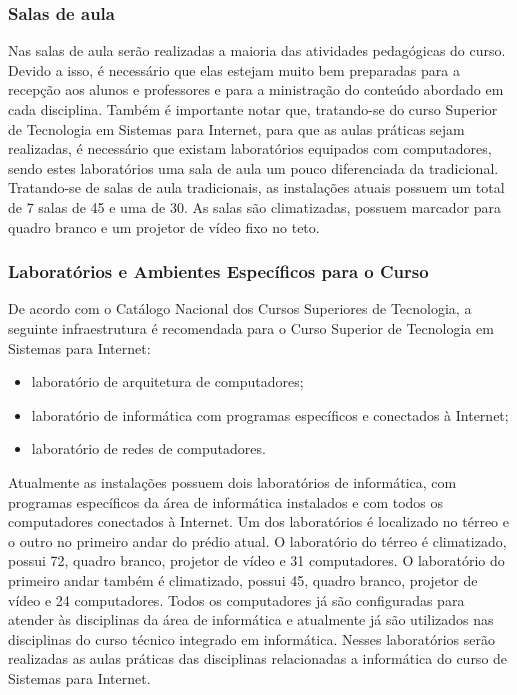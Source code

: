 \subsubsection{Salas de aula}

Nas salas de aula serão realizadas a maioria das atividades pedagógicas do curso. Devido a isso, é necessário que elas estejam muito bem preparadas para a recepção aos alunos e professores e para a ministração do conteúdo abordado em cada disciplina. Também é importante notar que, tratando-se do curso Superior de Tecnologia em Sistemas para Internet, para que as aulas práticas sejam realizadas, é necessário que existam laboratórios equipados com computadores,  sendo estes laboratórios uma sala de aula um pouco diferenciada da tradicional. Tratando-se de salas de aula tradicionais, as instalações atuais possuem um total de 7 salas de \unit{45}{\squaremetre} e uma de \unit{30}{\squaremetre}. As salas são climatizadas, possuem marcador para quadro branco e um projetor de vídeo fixo no teto.

\subsubsection{Laborat\'orios e Ambientes Espec\'ificos para o Curso}

	
	De acordo com o Catálogo Nacional dos Cursos Superiores de Tecnologia, a seguinte infraestrutura é recomendada para o Curso Superior de Tecnologia em Sistemas para Internet:
	
\begin{itemize}
	\item laboratório de arquitetura de computadores;
	\item laboratório de informática com programas específicos e conectados à Internet;
	\item laboratório de redes de computadores.
\end{itemize}

	Atualmente as instalações possuem dois laboratórios de informática, com programas específicos da área de informática instalados e com todos os computadores conectados à Internet. Um dos laboratórios é localizado no térreo e o outro no primeiro andar do prédio atual. O laboratório do térreo é climatizado, possui \unit{72}{\squaremetre}, quadro branco, projetor de vídeo e 31 computadores. O laboratório do primeiro andar também é climatizado, possui \unit{45}{\squaremetre}, quadro branco, projetor de vídeo e 24 computadores. Todos os computadores já são configuradas para atender às disciplinas da área de informática e atualmente já são utilizados nas disciplinas do curso técnico integrado em informática. Nesses laboratórios serão realizadas as aulas práticas das disciplinas relacionadas a informática do curso de Sistemas para Internet.
	

